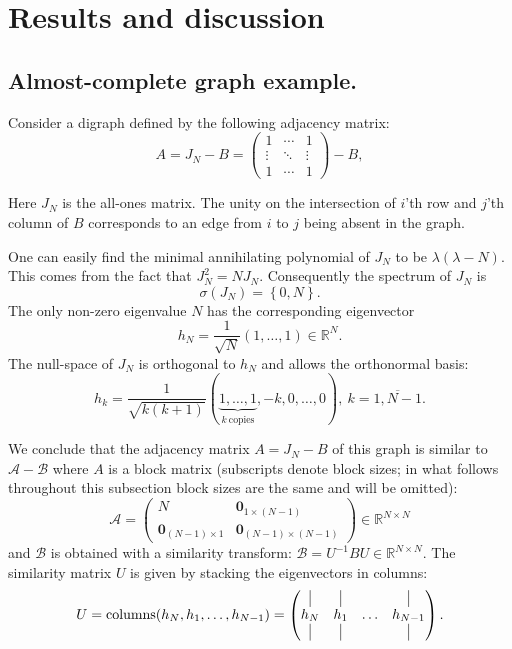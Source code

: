 \documentclass[a4paper]{jpconf}
\begin{document}
\section{Results and discussion}

\subsection*{Almost-complete graph example.}

Consider a digraph defined by the following adjacency matrix:
\[
    A = J_N - B = \begin{pmatrix}1 & \cdots & 1 \\ \vdots & \ddots & \vdots \\ 1 & \cdots & 1\end{pmatrix} - B,
\]

Here \( J_N \) is the all-ones matrix.
The unity on the intersection
of \( i \)'th row and \( j \)'th column of \( B \)
corresponds to an edge from \( i \) to \( j \)
being absent in the graph.

One can easily find the minimal annihilating polynomial of \( J_N \)
    to be \( \lambda(\lambda - N) \).
This comes from the fact that \( J_N^2 = N J_N \).
Consequently the spectrum of \( J_N \) is
\[
    \sigma(J_N) = \left\{0, N\right\}.
\]
The only non-zero eigenvalue \( N \) has the corresponding eigenvector
\[
    h_N = \frac{1}{\sqrt{N}} \left(1, \ldots, 1\right)\in\mathbb{R}^N.
\]
The null-space of \( J_N \) is orthogonal to \( h_N \)
    and allows the orthonormal basis:
\[
    h_k = \frac{1}{\sqrt{k(k+1)}} \left(\underbrace{1, \ldots, 1}_{k\ \text{copies}}, -k, 0, \ldots, 0\right),\ k=\overline{1, N-1}.
\]

We conclude that the adjacency matrix \( A = J_N - B \) of this graph
    is similar to \( \mathcal{A} - \mathcal{B} \)
    where \( A \) is a block matrix (subscripts denote block sizes; in what follows throughout this subsection block sizes are the same and will be omitted):
    \[
        \mathcal{A} = \left(\begin{array}{c|c}
        N & \mathbf{0}_{1{\times}(N{-}1)} \\ \hline
            \mathbf{0}_{(N{-}1){\times}1} & \mathbf{0}_{(N{-}1){\times}(N{-}1)}
        \end{array}\right) \in \mathbb{R}^{N{\times}N}
    \]
    and \( \mathcal{B} \) is obtained with a similarity transform:
    \(
        \mathcal{B} = U^{-1} B U \in \mathbb{R}^{N{\times}N}.
    \)
The similarity matrix \( U \) is given by stacking the eigenvectors in columns:
    \[
        U = \operatorname{columns}(h_N, h_1, \ldots, h_{N-1}) =
        \begin{pmatrix}
            \vline & \vline &        & \vline \\
            h_N    & h_1    & \ldots & h_{N-1} \\
            \vline & \vline &        & \vline

        \end{pmatrix}.
    \]
\end{document}
